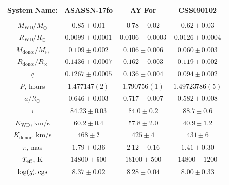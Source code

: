 \begin{table}
\begin{tabular}{cccc}
        \hline
        \hline \\[2em]
        \hline
        \textbf{System Name:}      & \textbf{ASASSN-17fo}      & \textbf{AY For}        & \textbf{CSS090102}     \\
        \hline \hline \\
        $M_\mathrm{WD}/M_\odot$    & $0.85\pm0.01$             & $0.78\pm0.02$          & $0.62\pm0.03$          \\
        $R_\mathrm{WD}/R_\odot$    & $0.0099\pm0.0001$         & $0.0106\pm0.0003$      & $0.0126\pm0.0004$      \\
        $M_\mathrm{donor}/M_\odot$ & $0.109\pm0.002$           & $0.106\pm0.006$        & $0.060\pm0.003$        \\
        $R_\mathrm{donor}/R_\odot$ & $0.1436\pm0.0007$         & $0.162\pm0.003$        & $0.119\pm0.002$        \\
        $q$                        & $0.1267\pm0.0005$         & $0.136\pm0.004$        & $0.094\pm0.002$        \\
        \hline
        $P$, hours                 & $1.477147(2)$             & $1.790756(1)$          & $1.49723786(5)$        \\
        $a/R_\odot$                & $0.646\pm0.003$           & $0.717\pm0.007$        & $0.582\pm0.008$        \\
        $i$                        & $84.23\pm0.03$            & $84.0\pm0.2$           & $88.7\pm0.6$           \\
        $K_\mathrm{WD}$, km/s      & $60.2\pm0.4$              & $57.8\pm2.0$           & $40.9\pm1.2$           \\
        $K_\mathrm{donor}$, km/s   & $468\pm2$                 & $425\pm4$              & $431\pm6$              \\
        \hline
        $\pi$, mas                 & $1.79\pm0.36$             & $2.12\pm0.16$          & $1.41\pm0.30$          \\
        $T_{\rm eff}$, K           & $14800\pm600$             & $18100\pm500$          & $14800\pm1200$         \\
        $\log(g), {\rm cgs}$       & $8.37\pm0.02$             & $8.28\pm0.04$          & $8.00\pm0.33$          \\
        \hline
        \hline \\[2em]
    \end{tabular}
\end{table}

